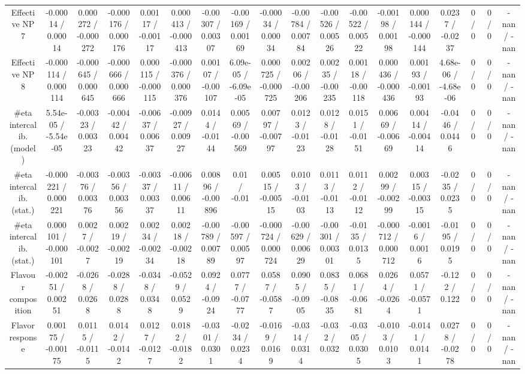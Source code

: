 \documentclass[10pt]{article}
\begin{document}
\begin{table}[htbp]
\begin{center}
\begin{tabular}{|c|c|c|c|c|c|c|c|c|c|c|c|c|c|c|c|c|c|}
  Effective NP 7 & -0.00014 / 0.00014 & 0.000272 / -0.000272 & -0.000176 / 0.000176 & 0.00117 / -0.00117 & 0.000413 / -0.000413 & -0.00307 / 0.00307 & -0.00169 / 0.00169 & -0.00034 / 0.00034 & -0.00784 / 0.00784 & -0.00526 / 0.00526 & -0.00522 / 0.00522 & -0.00198 / 0.00198 & 0.000144 / -0.000144 & 0.0237 / -0.0237 & 0 / 0 & 0 / 0 & -nan / -nan \\ 
  Effective NP 8 & -0.000114 / 0.000114 & -0.000645 / 0.000645 & -0.000666 / 0.000666 & 0.000115 / -0.000115 & -0.000376 / 0.000376 & 0.00107 / -0.00107 & 6.09e-05 / -6.09e-05 & 0.000725 / -0.000725 & 0.00206 / -0.00206 & 0.00235 / -0.00235 & 0.00118 / -0.00118 & 0.000436 / -0.000436 & 0.00193 / -0.00193 & 4.68e-06 / -4.68e-06 & 0 / 0 & 0 / 0 & -nan / -nan \\ 
  #eta intercalib. (model) & 5.54e-05 / -5.54e-05 & -0.00323 / 0.00323 & -0.00442 / 0.00442 & -0.00637 / 0.00637 & -0.00927 / 0.00927 & 0.0144 / -0.0144 & 0.00569 / -0.00569 & 0.00797 / -0.00797 & 0.0123 / -0.0123 & 0.0128 / -0.0128 & 0.0151 / -0.0151 & 0.00669 / -0.00669 & 0.00414 / -0.00414 & -0.0446 / 0.0446 & 0 / 0 & 0 / 0 & -nan / -nan \\ 
  #eta intercalib. (stat.) & -0.000221 / 0.000221 & -0.00376 / 0.00376 & -0.00356 / 0.00356 & -0.00337 / 0.00337 & -0.00611 / 0.00611 & 0.00896 / -0.00896 & 0.01 / -0.01 & 0.00515 / -0.00515 & 0.0103 / -0.0103 & 0.0113 / -0.0113 & 0.0112 / -0.0112 & 0.00299 / -0.00299 & 0.00315 / -0.00315 & -0.0235 / 0.0235 & 0 / 0 & 0 / 0 & -nan / -nan \\ 
  #eta intercalib. (stat.) & 0.000101 / -0.000101 & 0.0027 / -0.0027 & 0.00219 / -0.00219 & 0.00234 / -0.00234 & 0.00218 / -0.00218 & -0.00789 / 0.00789 & -0.00597 / 0.00597 & -0.000724 / 0.000724 & -0.00629 / 0.00629 & -0.00301 / 0.00301 & -0.0135 / 0.0135 & -0.000712 / 0.000712 & -0.0016 / 0.0016 & -0.0195 / 0.0195 & 0 / 0 & 0 / 0 & -nan / -nan \\ 
  Flavour composition & -0.00251 / 0.00251 & -0.0268 / 0.0268 & -0.0288 / 0.0288 & -0.0348 / 0.0348 & -0.0529 / 0.0529 & 0.0924 / -0.0924 & 0.0777 / -0.0777 & 0.0587 / -0.0587 & 0.0905 / -0.0905 & 0.0835 / -0.0835 & 0.0681 / -0.0681 & 0.0264 / -0.0264 & 0.0571 / -0.0571 & -0.122 / 0.122 & 0 / 0 & 0 / 0 & -nan / -nan \\ 
  Flavor response & 0.00175 / -0.00175 & 0.0115 / -0.0115 & 0.0142 / -0.0142 & 0.0127 / -0.0127 & 0.0182 / -0.0182 & -0.0301 / 0.0301 & -0.0234 / 0.0234 & -0.0169 / 0.0169 & -0.0314 / 0.0314 & -0.032 / 0.032 & -0.0305 / 0.0305 & -0.0103 / 0.0103 & -0.0141 / 0.0141 & 0.0278 / -0.0278 & 0 / 0 & 0 / 0 & -nan / -nan \\ 

\end{tabular}
\end{center}
\end{table}
\end{document}
